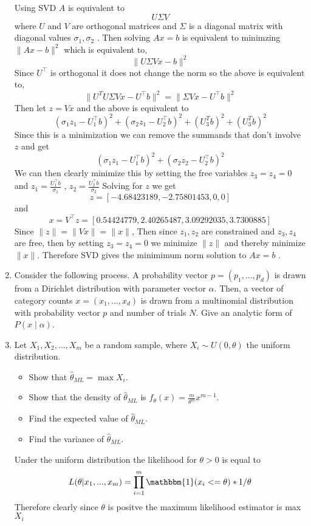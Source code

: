 \documentclass{article}
\begin{document}
\begin{enumerate}
\color{blue}
Using SVD $A$ is equivalent to 
$$
U \Sigma V
$$
where $U$ and $V$ are orthogonal matrices and $\Sigma$ is a diagonal matrix with diagonal values $\sigma_1, \sigma_2$ . 
Then solving $Ax = b$ is equivalent to minimzing $\lVert Ax - b \rVert ^ 2$ which is equivalent to,
$$
\lVert U \Sigma V x - b \rVert ^ 2
$$
Since $U^\top$ is orthogonal it does not change the norm so the above is equivalent to,
$$
\lVert U^T U \Sigma V x - U^\top b \rVert ^2 = \lVert \Sigma V x - U^\top b \rVert ^2
$$
Then let $z = V x$ and the above is equivalent to 
$$
(\sigma_1 z_1 - U_1^\top b)^2 + (\sigma_2 z_1 - U_2^\top b)^2  + (U_3^T b)^2 + (U_3^T b)^2
$$
Since this is a minimization we can remove the summands that don't involve $z$ and get
$$
(\sigma_1 z_1 - U_1^\top b)^2 + (\sigma_2 z_2 - U_2^\top b)^2 
$$
We can then clearly minimize this by setting the free variables $z_3 = z_4 = 0$ and
$z_1 = \frac{U_1^\top b}{\sigma_1}$ , $z_2 = \frac{U_2^\top b}{\sigma_2}$
Solving for $z$ we get
$$
z = [-4.68423189, -2.75801453,  0,  0]
$$  
and 
$$
x = V^\top z = [ 0.54424779, 2.40265487, 3.09292035, 3.7300885]
$$
Since $\lVert z \rVert = \lVert Vx \rVert = \lVert x \rVert$,
Then since $z_1, z_2$ are constrained and $z_3, z_4$ are free, then by setting $z_3=z_4=0$ we minimize $\lVert z \rVert$ and thereby minimize $\lVert x \rVert$. Therefore SVD gives the minimimum norm solution to $Ax = b$ .
\color{black}


\item
Consider the following process.  A probability vector $p=(p_1, \ldots, p_d)$ is drawn from a Dirichlet distribution with parameter vector $\alpha$.
Then, a vector of category counts $x=(x_1, \ldots, x_d)$ is drawn from a multinomial distribution with probability vector $p$ and number of trials $N$. Give an analytic form of $P(x \mid \alpha)$.  

\item
Let $X_1, X_2, \ldots, X_m$ be a random sample, where $X_i \sim U(0,\theta)$ the uniform distribution.
\begin{itemize}
\item Show that $\hat\theta_{ML} = \max X_i$.
\item Show that the density of $\hat\theta_{ML}$ is $f_\theta(x) = \frac{m}{\theta^m} x^{m-1}$.
\item Find the expected value of $\hat\theta_{ML}$.
\item Find the variance of $\hat\theta_{ML}$.
\end{itemize}

\color{blue}
Under the uniform distribution the likelihood for $\theta > 0$ is equal to
$$
L(\theta | x_1, ...,x_m) = \prod_{i = 1}^m \mathbbm{1}(x_i <= \theta) * 1/\theta 
$$
Therefore clearly since $\theta$ is positve the maximum likelihood estimator is max$X_i$


\end{enumerate}
\end{document}
